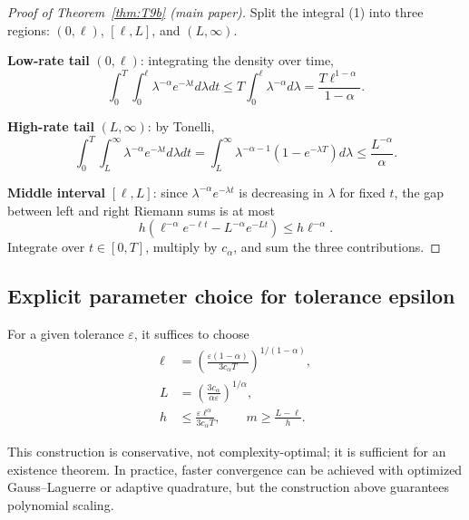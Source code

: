 \begin{proof}[Proof of Theorem~\ref{thm:T9b} (main paper)]
Split the integral (1) into three regions: \((0, \ell)\), \([\ell, L]\), and \((L, \infty)\).

\textbf{Low-rate tail} \((0, \ell)\): integrating the density over time,
\[
\int_0^T \int_0^\ell \lambda^{-\alpha} e^{-\lambda t} d\lambda dt
\le T \int_0^\ell \lambda^{-\alpha} d\lambda
= \frac{T \ell^{1-\alpha}}{1-\alpha}.
\]

\textbf{High-rate tail} \((L, \infty)\): by Tonelli,
\[
\int_0^T \int_L^\infty \lambda^{-\alpha} e^{-\lambda t} d\lambda dt
= \int_L^\infty \lambda^{-\alpha-1}(1-e^{-\lambda T}) d\lambda
\le \frac{L^{-\alpha}}{\alpha}.
\]

\textbf{Middle interval} \([\ell, L]\): since \(\lambda^{-\alpha} e^{-\lambda t}\) is decreasing in \(\lambda\) for fixed \(t\), the gap between left and right Riemann sums is at most
\[
h \left( \ell^{-\alpha} e^{-\ell t} - L^{-\alpha} e^{-Lt} \right)
\le h \ell^{-\alpha}.
\]
Integrate over \(t \in [0,T]\), multiply by \(c_\alpha\), and sum the three contributions.
\end{proof}

\subsection{Explicit parameter choice for tolerance epsilon}

For a given tolerance \(\varepsilon\), it suffices to choose
\begin{align}
\ell &= \left( \frac{\varepsilon(1-\alpha)}{3 c_\alpha T} \right)^{1/(1-\alpha)}, \\
L &= \left( \frac{3 c_\alpha}{\alpha \varepsilon} \right)^{1/\alpha}, \\
h &\le \frac{\varepsilon \ell^\alpha}{3 c_\alpha T},
\qquad
m \ge \frac{L-\ell}{h}.
\end{align}

This construction is conservative, not complexity-optimal; it is sufficient for an existence theorem. In practice, faster convergence can be achieved with optimized Gauss--Laguerre or adaptive quadrature, but the construction above guarantees polynomial scaling.

